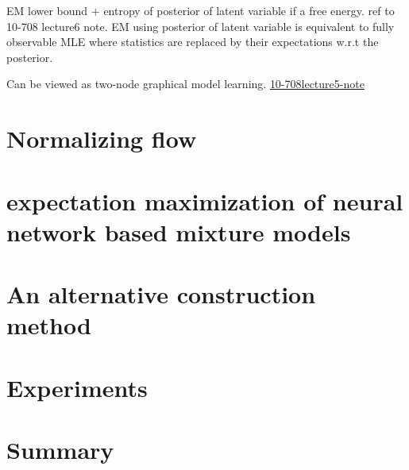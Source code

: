 \begin{remark}
  EM lower bound $+$ entropy of posterior of latent variable if a free energy. ref to 10-708 lecture6 note.
  EM using posterior of latent variable is equivalent to fully observable MLE where statistics are replaced by their expectations w.r.t the posterior.
\end{remark}

Can be viewed as two-node graphical model learning. \href{https://sailinglab.github.io/pgm-spring-2019/notes/lecture-05/}{10-708lecture5-note}
\section{Normalizing flow}

\section{expectation maximization of neural network based mixture models}

\section{An alternative construction method}

\section{Experiments}


\section{Summary}

